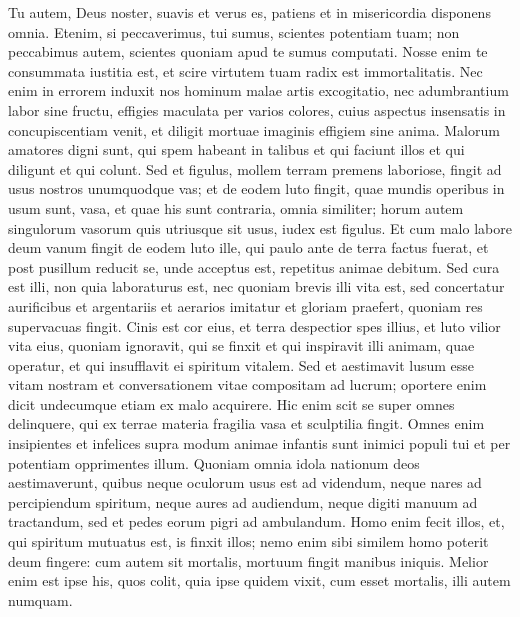 \begin{biblechapter}
\begin{biblechapter}
\begin{biblechapter}
\begin{biblechapter}
\begin{biblechapter}
\begin{biblechapter}
\begin{biblechapter}
\begin{biblechapter}
\begin{biblechapter}
\begin{biblechapter}
\begin{biblechapter}
\begin{biblechapter}
\begin{biblechapter}
\begin{biblechapter}
\begin{biblechapter}
\verse Tu autem, Deus noster, suavis et verus es,
 patiens et in misericordia disponens omnia.
 \verse Etenim, si peccaverimus, tui sumus, scientes potentiam tuam;
 non peccabimus autem, scientes quoniam apud te sumus computati.
 \verse Nosse enim te consummata iustitia est,
 et scire virtutem tuam radix est immortalitatis.
 \verse Nec enim in errorem induxit nos hominum malae artis excogitatio,
 nec adumbrantium labor sine fructu,
 effigies maculata per varios colores,
 \verse cuius aspectus insensatis in concupiscentiam venit,
 et diligit mortuae imaginis effigiem sine anima.
 \verse Malorum amatores digni sunt, qui spem habeant in talibus
 et qui faciunt illos et qui diligunt et qui colunt.
 \verse Sed et figulus, mollem terram premens laboriose,
 fingit ad usus nostros unumquodque vas;
 et de eodem luto fingit,
 quae mundis operibus in usum sunt, vasa,
 et quae his sunt contraria, omnia similiter;
 horum autem singulorum vasorum quis utriusque sit usus,
 iudex est figulus.
 \verse Et cum malo labore deum vanum fingit de eodem luto
 ille, qui paulo ante de terra factus fuerat,
 et post pusillum reducit se, unde acceptus est,
 repetitus animae debitum.
 \verse Sed cura est illi, non quia laboraturus est,
 nec quoniam brevis illi vita est,
 sed concertatur aurificibus et argentariis
 et aerarios imitatur
 et gloriam praefert, quoniam res supervacuas fingit.
 \verse Cinis est cor eius,
 et terra despectior spes illius,
 et luto vilior vita eius,
 \verse quoniam ignoravit, qui se finxit
 et qui inspiravit illi animam, quae operatur,
 et qui insufflavit ei spiritum vitalem.
 \verse Sed et aestimavit lusum esse vitam nostram
 et conversationem vitae compositam ad lucrum;
 oportere enim dicit undecumque etiam ex malo acquirere.
 \verse Hic enim scit se super omnes delinquere,
 qui ex terrae materia
 fragilia vasa et sculptilia fingit.
 \verse Omnes enim insipientes et infelices supra modum animae infantis
 sunt inimici populi tui et per potentiam opprimentes illum.
 \verse Quoniam omnia idola nationum deos aestimaverunt,
 quibus neque oculorum usus est ad videndum,
 neque nares ad percipiendum spiritum,
 neque aures ad audiendum,
 neque digiti manuum ad tractandum,
 sed et pedes eorum pigri ad ambulandum.
 \verse Homo enim fecit illos,
 et, qui spiritum mutuatus est, is finxit illos;
 nemo enim sibi similem homo poterit deum fingere:
 \verse cum autem sit mortalis, mortuum fingit manibus iniquis.
 Melior enim est ipse his, quos colit,
 quia ipse quidem vixit, cum esset mortalis, illi autem numquam.

\end{biblechapter}
\end{biblechapter}
\end{biblechapter}
\end{biblechapter}
\end{biblechapter}
\end{biblechapter}
\end{biblechapter}
\end{biblechapter}
\end{biblechapter}
\end{biblechapter}
\end{biblechapter}
\end{biblechapter}
\end{biblechapter}
\end{biblechapter}
\end{biblechapter}
